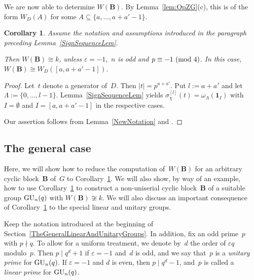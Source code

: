 \documentclass[12pt]{amsart}
\newcommand{\bB}{{\mathbf{B}}}
\def\GU{ \text{\rm GU} }
\newtheorem{cor}[thm]{Corollary}
\theoremstyle{theorem}
\theoremstyle{definition}
\theoremstyle{remark}
\begin{document}
We are now able to determine $W( {\bB} )$. By Lemma~\ref{lem:OpZG}(c), this is 
of the form $W_D( A )$ for some $A \subseteq \{ a, \ldots, a + a' - 1 \}$.

\begin{cor}
\label{GLNQdeq1Source}
Assume the notation and assumptions introduced in the paragraph preceding
{\rm Lemma~\ref{SignSequenceLem}}.

Then $W({\bB}) \cong k$, unless $\varepsilon = -1$,~$n$ is odd and 
$p \equiv -1\,\,(\mbox{\rm mod}\,\,4)$. In this case,
$W({\bB}) \cong W_{{D}}([a,a+a' - 1])$.
\end{cor}
\begin{proof}
Let~$t$ denote a generator of~${D}$. Then $|t| = p^{a + a'}$. 
Put $l := a + a'$ and let $\Lambda := \{ 0, \ldots, l - 1 \}$.
Lemma~\ref{SignSequenceLem} yields
$\sigma_{{\chi}}^{[l]}( t ) = \omega_{\Lambda}( \mathbf{1}_I )$ with 
$I = \emptyset$ and $I = [a, a+a' - 1]$ in the respective cases.

Our assertion follows from Lemma~\ref{NewNotation} and \cite[Lemma~$3.3$]{HL24}.
\end{proof}

\subsection{The general case}
Here, we will show how to reduce the computation of~$W({\bB})$ for an 
arbitrary cyclic block~${\bB}$ of~${G}$ to 
Corollary~\ref{GLNQdeq1Source}. We will also show, 
by way of an example, how to use Corollary~\ref{GLNQdeq1Source} to construct a 
non-uniserial cyclic block~${\bB}$ of a suitable group $\GU_n(q)$ with 
$W(\bB) \not\cong k$. We will also discuss an important consequence of 
Corollary~\ref{GLNQdeq1Source} to the special linear and unitary groups.

Keep the notation introduced at the beginning of 
Section~\ref{TheGeneralLinearAndUnitaryGroups}. In addition, fix an odd 
prime~$p$ with $p \nmid q$. To allow for a uniform treatment, we denote by~$d$ 
the order of $\varepsilon q$ modulo~$p$. 
Then $p \mid q^d + 1$ if $\varepsilon = -1$ and~$d$ is odd, and we say that~$p$ 
is a \textit{unitary prime} for $\GU_n( q )$. If $\varepsilon = -1$ and $d$ is 
even, then $p \mid q^d - 1$, and~$p$ is called a \textit{linear prime} for 
$\GU_n( q )$.
\end{document}
